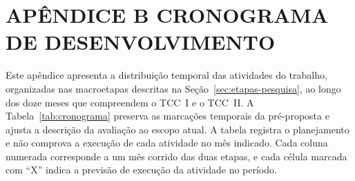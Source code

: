 
\chapter[APÊNDICE B -- CRONOGRAMA DE DESENVOLVIMENTO]{{\centering APÊNDICE B \textendash{} CRONOGRAMA DE DESENVOLVIMENTO}}  \label{ap:cronograma}

Este apêndice apresenta a distribuição temporal das atividades do trabalho, organizadas nas macroetapas descritas na Seção~\ref{sec:etapas-pesquisa}, ao longo dos doze meses que compreendem o TCC~I e o TCC~II. A Tabela~\ref{tab:cronograma} preserva as marcações temporais da pré-proposta e ajusta a descrição da avaliação ao escopo atual. A tabela registra o planejamento e não comprova a execução de cada atividade no mês indicado. Cada coluna numerada corresponde a um mês corrido das duas etapas, e cada célula marcada com ``X'' indica a previsão de execução da atividade no período.

